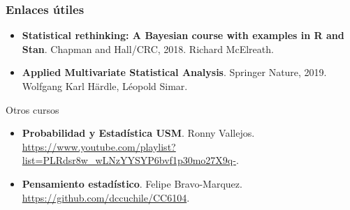\documentclass[table]{beamer}
\begin{document}
\begin{frame}
\frametitle{Enlaces útiles}
\begin{itemize}
  \item \textbf{Statistical rethinking: A Bayesian course with examples in R and Stan}. Chapman and Hall/CRC, 2018. Richard McElreath.%
           \item \textbf{Applied Multivariate Statistical Analysis}. Springer Nature, 2019. Wolfgang Karl H\"ardle, L\'eopold Simar.
\end{itemize}         
    \begin{block}{Otros cursos}
        \begin{itemize}
            \item \textbf{Probabilidad y Estadística USM}. Ronny Vallejos. \url{https://www.youtube.com/playlist?list=PLRdsr8w_wLNzYYSYP6bvf1p30mo27X9q-}.
            \item \textbf{Pensamiento estadístico}. Felipe Bravo-Marquez. \url{https://github.com/dccuchile/CC6104}.
        \end{itemize}
    \end{block}
\end{frame}

\iffalse
\begin{frame}[allowframebreaks, noframenumbering]
\frametitle<presentation>{References}
\printbibliography
%
\end{frame}
\fi
\end{document}

